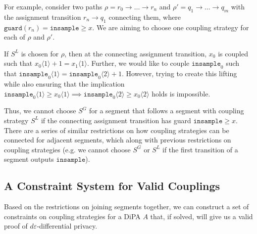 \documentclass[12pt]{article}
\newcommand{\gguard}[1][x]{\texttt{insample}\geq #1}
\newcommand{\brangle}[1]{\langle #1 \rangle}
\newcommand{\guard}{\texttt{guard}}
\theoremstyle{definition}
\begin{document}
For example, consider two paths $\rho = r_0\to\ldots\to r_n$ and $\rho' = q_1\to \ldots \to q_m$ with the assignment transition $r_n\to q_1$ connecting them, where $\guard(r_n) = \gguard$. We are aiming to choose one coupling strategy for each of $\rho$ and $\rho'$. 

If $S^L$ is chosen for $\rho$, then at the connecting assignment transition, $x_0$ is coupled such that $x_0\brangle{1}+1 =x_1\brangle{1}$. Further, we would like to couple $\texttt{insample}_0$ such that $\texttt{insample}_0\brangle{1} = \texttt{insample}_0\brangle{2}+1$. However, trying to create this lifting while also ensuring that the implication $\texttt{insample}_0\brangle{1} \geq x_0\brangle{1}\implies \texttt{insample}_0\brangle{2} \geq x_0\brangle{2}$ holds is impossible. 

Thus, we cannot choose $S^G$ for a segment that follows a segment with coupling strategy $S^L$ if the connecting assignment transition has guard $\gguard$. There are a series of similar restrictions on how coupling strategies can be connected for adjacent segments, which along with previous restrictions on coupling strategies (e.g. we cannot choose $S^G$ or $S^L$ if the first transition of a segment outputs $\texttt{insample}$).

\subsection{A Constraint System for Valid Couplings}

Based on the restrictions on joining segments together, we can construct a set of constraints on coupling strategies for a DiPA $A$ that, if solved, will give us a valid proof of $d\varepsilon$-differential privacy.
\end{document}
